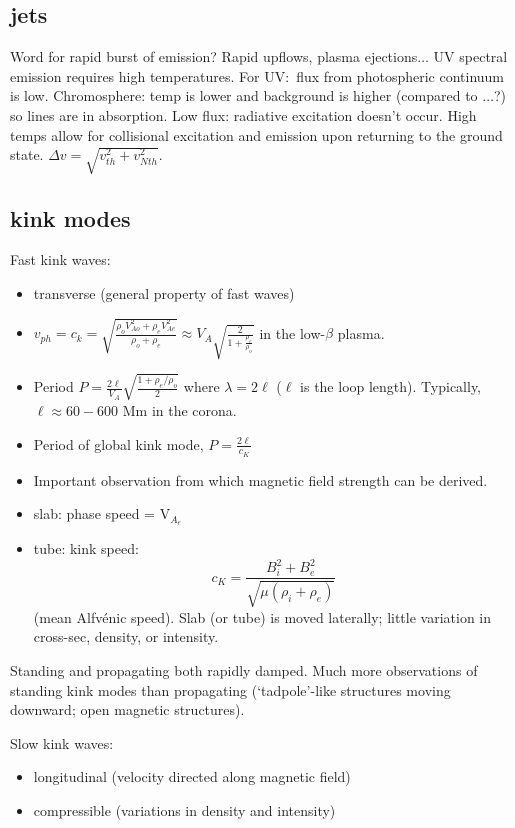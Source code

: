 \documentclass{article}
\begin{document}
\subsection{jets}
Word for rapid burst of emission? Rapid upflows, plasma
ejections$\ldots$ UV spectral emission requires high temperatures.
For UV:\ flux from photospheric continuum is low. Chromosphere:
temp is lower and background is higher (compared to $\ldots$?)
so lines are in absorption. Low flux: radiative excitation doesn't occur.
High temps allow for collisional excitation and emission upon returning
to the ground state. $\Delta v = \sqrt{v_{th}^2+v_{Nth}^2}$.

\subsection{kink modes}
Fast kink waves:
\begin{itemize}
    \item transverse (general property of fast waves)
    \item $v_{ph} = c_k = \sqrt{\frac{\rho_oV^2_{Ao}+\rho_eV^2_{Ae}}
        {\rho_o+\rho_e}} \approx V_A\sqrt{\frac{2}{1+\frac{\rho_e}{\rho_o}}} $
        in the low-$\beta$ plasma.
    \item Period $P=\frac{2\ell}{V_A}\sqrt{\frac{1+\rho_e/\rho_o}{2}}$
        where $\lambda=2\ell$ ($\ell$ is the loop length).
        Typically, $\ell \approx 60-600$ Mm in the corona.
    \item Period of global kink mode, $P = \frac{2\ell}{c_K}$
    \item Important observation from which magnetic field strength
        can be derived.
    \item slab: phase speed = V$_{A_e}$
    \item tube: kink speed:
        $$ c_K = \frac{B_i^2 + B_e^2}{\sqrt{\mu(\rho_i+\rho_e)}} $$
        (mean Alfv\'enic speed).
        Slab (or tube) is moved laterally; little variation in cross-sec,
        density, or intensity.
\end{itemize}
Standing and propagating both rapidly damped. Much more observations of
standing kink modes than propagating (`tadpole'-like structures moving
downward; open magnetic structures).

Slow kink waves:
\begin{itemize}
    \item longitudinal (velocity directed along magnetic field)
    \item compressible (variations in density and intensity)
\end{itemize}
\end{document}
